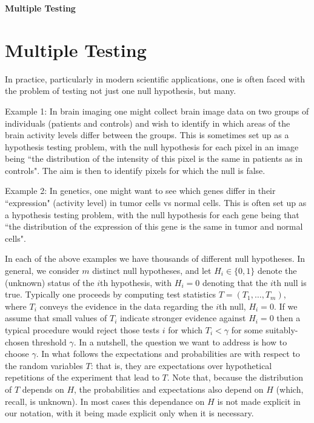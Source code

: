 \documentclass[times,11pt]{article}
\begin{document}

\begin{center}
\Large\bf Multiple Testing
\end{center}
\normalsize

\section{Multiple Testing}

In practice, particularly in modern scientific applications, one is often faced with the problem of testing not just one null hypothesis, but many. 

Example 1: In brain imaging one might collect brain image data on two groups of individuals (patients and controls) and wish to identify in which areas of the brain activity levels differ between the groups. 
This is sometimes set up as a hypothesis testing problem, with the null hypothesis for each pixel in an image being ``the distribution of the intensity of this pixel is the same in patients as in controls". The aim is then to identify pixels for which the null is false.

Example 2: In genetics, 
one might want to see which genes differ in their ``expression" (activity level) in tumor cells vs normal cells. This is often set up as a hypothesis testing problem, with the null hypothesis for each gene being that ``the distribution of the expression of this gene is the same in tumor and normal cells".

In each of the above examples we have thousands of different null hypotheses. In general, we consider $m$ distinct null hypotheses, and let $H_i \in \{0,1\}$ denote the (unknown) status of the $i$th hypothesis, with $H_i=0$ denoting that the $i$th null is true.
Typically one proceeds by computing test statistics $T=(T_1,\dots,T_m)$, where $T_i$ conveys the evidence in the data regarding the $i$th null, $H_i=0$. If we assume that small values of $T_i$ indicate stronger evidence against $H_i=0$ then a typical procedure would reject those tests $i$ for which $T_i < \gamma$ for some suitably-chosen threshold $\gamma$. In a nutshell, the question we want to address is how to choose $\gamma$. In what follows the expectations and probabilities are with respect to the random variables $T$: that is, they are expectations over hypothetical repetitions of the experiment that lead to $T$.
Note that, because the distribution of $T$ depends on $H$, the probabilities and expectations also depend on $H$ (which, recall, is unknown). In most cases this dependance on $H$ is not made explicit in our notation, with it being made explicit only when it is necessary.
\end{document}
